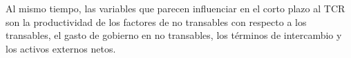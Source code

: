 \documentclass[12pt,letterpaper]{article}
\begin{document}
Al mismo tiempo, las variables que parecen influenciar en el corto plazo al TCR son la productividad de los factores de no transables con respecto a los transables, el gasto de gobierno en no transables, los términos de intercambio y los activos externos netos.


\end{document}
